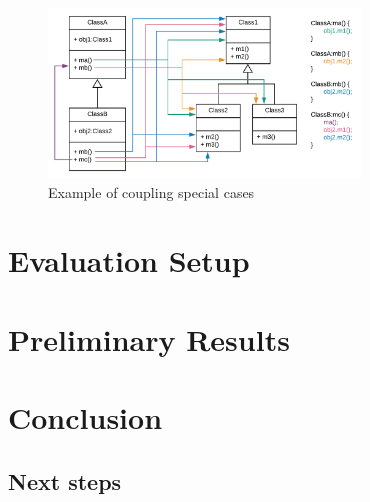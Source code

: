 \documentclass[a4paper]{article}
\begin{document}
\begin{figure}[ht]
\begin{center}
\includegraphics[height=4.5cm]{img/specialcases.png}
\caption{Example of coupling special cases}
\label{fig:specialcases}
\end{center}
\end{figure}


\section{Evaluation Setup}


\section{Preliminary Results}



\section{Conclusion}

\subsection{Next steps}




\end{document}
